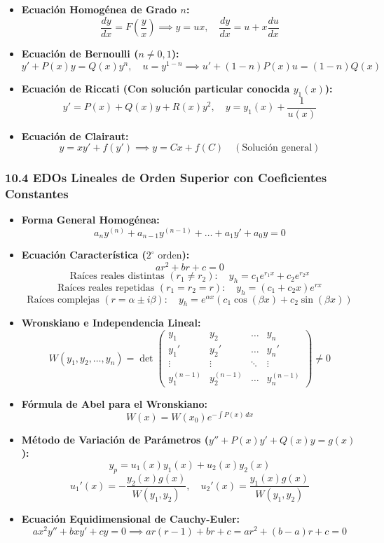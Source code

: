 \documentclass[11pt,a4paper]{article}
\begin{document}
\begin{itemize}
  \item \textbf{Ecuación Homogénea de Grado $n$:}
  \[
    \frac{dy}{dx} = F\left(\frac{y}{x}\right) \implies y = ux, \quad \frac{dy}{dx} = u + x\frac{du}{dx}
  \]
  \item \textbf{Ecuación de Bernoulli ($n \ne 0, 1$):}
  \[
    y' + P(x)y = Q(x)y^n, \quad u = y^{1 - n} \implies u' + (1 - n)P(x)u = (1 - n)Q(x)
  \]
  \item \textbf{Ecuación de Riccati (Con solución particular conocida $y_1(x)$):}
  \[
    y' = P(x) + Q(x)y + R(x)y^2, \quad y = y_1(x) + \frac{1}{u(x)}
  \]
  \item \textbf{Ecuación de Clairaut:}
  \[
    y = x y' + f(y') \implies y = Cx + f(C) \quad (\text{Solución general})
  \]
\end{itemize}

\subsubsection*{10.4 EDOs Lineales de Orden Superior con Coeficientes Constantes}

\begin{itemize}
  \item \textbf{Forma General Homogénea:}
  \[
    a_n y^{(n)} + a_{n-1} y^{(n-1)} + \dots + a_1 y' + a_0 y = 0
  \]
  \item \textbf{Ecuación Característica ($2^\circ \text{ orden}$):}
  \[
    a r^2 + b r + c = 0
  \]
  \[
    \text{Raíces reales distintas } (r_1 \ne r_2): \quad y_h = c_1 e^{r_1 x} + c_2 e^{r_2 x}
  \]
  \[
    \text{Raíces reales repetidas } (r_1 = r_2 = r): \quad y_h = (c_1 + c_2 x)e^{r x}
  \]
  \[
    \text{Raíces complejas } (r = \alpha \pm i\beta): \quad y_h = e^{\alpha x}(c_1 \cos(\beta x) + c_2 \sin(\beta x))
  \]
  \item \textbf{Wronskiano e Independencia Lineal:}
  \[
    W(y_1, y_2, \dots, y_n) = \det\begin{pmatrix} y_1 & y_2 & \dots & y_n \\ y_1' & y_2' & \dots & y_n' \\ \vdots & \vdots & \ddots & \vdots \\ y_1^{(n-1)} & y_2^{(n-1)} & \dots & y_n^{(n-1)} \end{pmatrix} \ne 0
  \]
  \item \textbf{Fórmula de Abel para el Wronskiano:}
  \[
    W(x) = W(x_0) e^{-\int P(x) \, dx}
  \]
  \item \textbf{Método de Variación de Parámetros ($y'' + P(x)y' + Q(x)y = g(x)$):}
  \[
    y_p = u_1(x)y_1(x) + u_2(x)y_2(x)
  \]
  \[
    u_1'(x) = -\frac{y_2(x) g(x)}{W(y_1, y_2)}, \quad u_2'(x) = \frac{y_1(x) g(x)}{W(y_1, y_2)}
  \]
  \item \textbf{Ecuación Equidimensional de Cauchy-Euler:}
  \[
    a x^2 y'' + b x y' + c y = 0 \implies a r(r - 1) + b r + c = a r^2 + (b - a)r + c = 0
  \]
\end{itemize}
\end{document}
